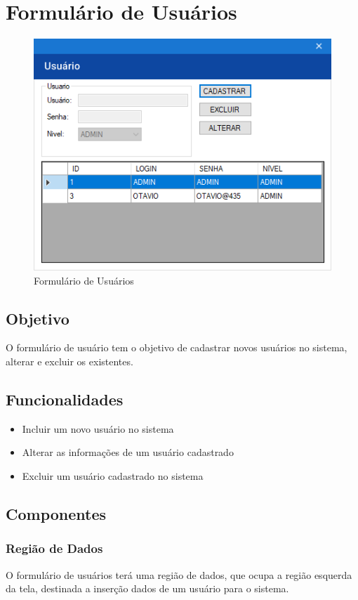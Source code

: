\documentclass[
	article,			%
	12pt,				%
	oneside,			%
	a4paper,			%
	english,			%
	brazil,				%
	sumario=tradicional
	]{abntex2}
\begin{document}
	\section{Formulário de Usuários}
		\begin{figure}[!htb]
			\centering
			\includegraphics[scale=1.3]{./Figuras/FrmUsuario.png}
			\caption{Formulário de Usuários}
		\end{figure}
		\subsection{Objetivo}
		O formulário de usuário tem o objetivo de cadastrar novos usuários no sistema, alterar e excluir os existentes.
		\subsection{Funcionalidades}
			\begin{itemize}
				\item Incluir um novo usuário no sistema
				\item Alterar as informações de um usuário cadastrado
				\item Excluir um usuário cadastrado no sistema
			\end{itemize}
		\subsection{Componentes}		
			\subsubsection{Região de Dados}
			O formulário de usuários terá uma região de dados, que ocupa a região esquerda da tela, destinada a inserção dados de um usuário para o sistema.
\end{document}
